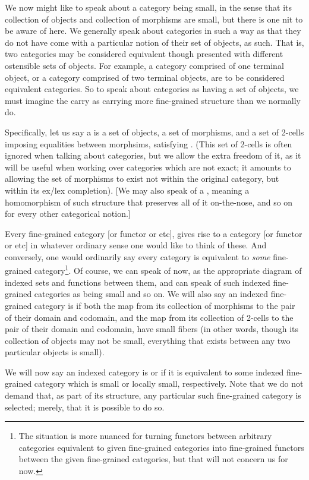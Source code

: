 We now might like to speak about a category being small, in the sense that its collection of objects and collection of morphisms are small, but there is one nit to be aware of here. We generally speak about categories in such a way as that they do not have come with a particular notion of their set of objects, as such. That is, two categories may be considered equivalent though presented with different ostensible sets of objects. For example, a category comprised of one terminal object, or a category comprised of two terminal objects, are to be considered equivalent categories. So to speak about categories as having a set of objects, we must imagine the carry as carrying more fine-grained structure than we normally do.

Specifically, let us say a  is a set of objects, a set of morphisms, and a set of 2-cells imposing equalities between morphsims, satisfying \TODO. (This set of 2-cells is often ignored when talking about categories, but we allow the extra freedom of it, as it will be useful when working over categories which are not exact; it amounts to allowing the set of morphisms to exist not within the original category, but within its ex/lex completion). [We may also speak of a , meaning a homomorphism of such structure that preserves all of it on-the-nose, and so on for every other categorical notion.]

Every fine-grained category [or functor or etc], gives rise to a category [or functor or etc] in whatever ordinary sense one would like to think of these. And conversely, one would ordinarily say every category is equivalent to \emph{some} fine-grained category\footnote{The situation is more nuanced for turning functors between arbitrary categories equivalent to given fine-grained categories into fine-grained functors between the given fine-grained categories, but that will not concern us for now.}. Of course, we can speak of  now, as the appropriate diagram of indexed sets and functions between them, and can speak of such indexed fine-grained categories as being small and so on. We will also say an indexed fine-grained category is  if both the map from its collection of morphisms to the pair of their domain and codomain, and the map from its collection of 2-cells to the pair of their domain and codomain, have small fibers (in other words, though its collection of objects may not be small, everything that exists between any two particular objects is small).

We will now say an indexed category is  or  if it is equivalent to some indexed fine-grained category which is small or locally small, respectively. Note that we do not demand that, as part of its structure, any particular such fine-grained category is selected; merely, that it is possible to do so.